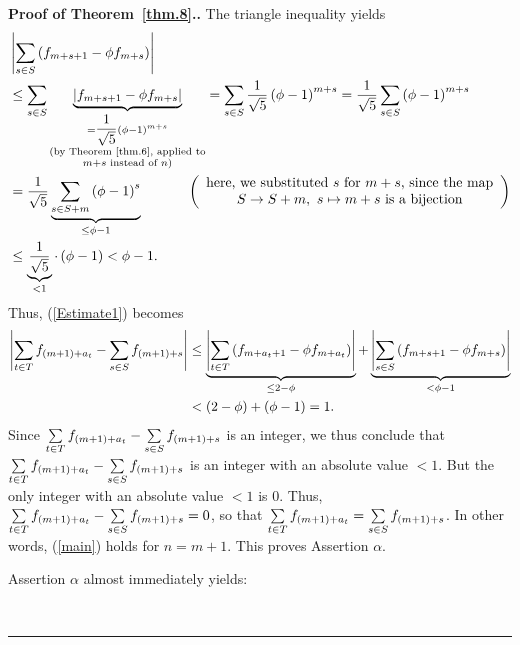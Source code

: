 \documentclass[numbers=enddot,12pt,final,onecolumn,notitlepage]{scrartcl}%
\numberwithin{exer}{section}
\theoremstyle{definition}
\newenvironment{proof}[1][Proof]{\noindent\textbf{#1.} }{\ \rule{0.5em}{0.5em}}
\let\sumnonlimits\sum
\renewcommand{\sum}{\sumnonlimits\limits}
\begin{document}
\begin{proof}[Proof of Theorem~\ref{thm.8}.]
The triangle inequality yields%
\begin{align*}
&  \left\vert \sum\limits_{s\in S}\left(  f_{m+s+1}-\phi f_{m+s}\right)
\right\vert \\
&  \leq\sum\limits_{s\in S}\underbrace{\left\vert f_{m+s+1}-\phi
f_{m+s}\right\vert }_{\substack{=\dfrac{1}{\sqrt{5}}\left(  \phi-1\right)
^{m+s}\\\text{(by Theorem~\ref{thm.6}, applied to}\\m+s\text{ instead of }n\text{)}%
}}=\sum\limits_{s\in S}\dfrac{1}{\sqrt{5}}\left(  \phi-1\right)  ^{m+s}%
=\dfrac{1}{\sqrt{5}}\sum\limits_{s\in S}\left(  \phi-1\right)  ^{m+s}\\
&  =\dfrac{1}{\sqrt{5}}\underbrace{\sum\limits_{s\in S+m}\left(
\phi-1\right)  ^{s}}_{\leq\phi-1}\ \ \ \ \ \ \ \ \ \ \left(
\begin{array}
[c]{c}%
\text{here, we substituted }s\text{ for }m+s\text{, since the map}\\
S\rightarrow S+m,\ s\mapsto m+s\text{ is a bijection}%
\end{array}
\right) \\
&  \leq\underbrace{\dfrac{1}{\sqrt{5}}}_{<1}\cdot\left(  \phi-1\right)
<\phi-1.
\end{align*}
Thus, (\ref{Estimate1}) becomes%
\begin{align}
\left\vert \sum\limits_{t\in T}f_{\left(  m+1\right)  +a_{t}}-\sum
\limits_{s\in S}f_{\left(  m+1\right)  +s}\right\vert  &  \leq
\underbrace{\left\vert \sum\limits_{t\in T}\left(  f_{m+a_{t}+1}-\phi
f_{m+a_{t}}\right)  \right\vert }_{\leq2-\phi}+\underbrace{\left\vert
\sum\limits_{s\in S}\left(  f_{m+s+1}-\phi f_{m+s}\right)  \right\vert
}_{<\phi-1}\nonumber\\
&  <\left(  2-\phi\right)  +\left(  \phi-1\right)  =1.\nonumber
\end{align}
Since $\sum\limits_{t\in T}f_{\left(  m+1\right)  +a_{t}}-\sum\limits_{s\in
S}f_{\left(  m+1\right)  +s}$ is an integer, we thus conclude that
$\sum\limits_{t\in T}f_{\left(  m+1\right)  +a_{t}}-\sum\limits_{s\in
S}f_{\left(  m+1\right)  +s}$ is an integer with an absolute value $<1$. But
the only integer with an absolute value $<1$ is $0$. Thus, $\sum\limits_{t\in
T}f_{\left(  m+1\right)  +a_{t}}-\sum\limits_{s\in S}f_{\left(  m+1\right)
+s}=0$, so that $\sum\limits_{t\in T}f_{\left(  m+1\right)  +a_{t}}%
=\sum\limits_{s\in S}f_{\left(  m+1\right)  +s}$. In other words, (\ref{main})
holds for $n=m+1$. This proves Assertion $\alpha$.

Assertion $\alpha$ almost immediately yields:


\end{proof}
\end{document}

